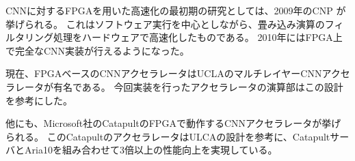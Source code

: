 CNNに対するFPGAを用いた高速化の最初期の研究としては、2009年のCNP \cite{cnp}が挙げられる。
これはソフトウェア実行を中心としながら、畳み込み演算のフィルタリング処理をハードウェアで高速化したものである。
2010年にはFPGA上で完全なCNN実装\cite{NEC_Labs_America1}\cite{NEC_Labs_America2}\cite{NEC_Labs_America3}が行えるようになった。

現在、FPGAベースのCNNアクセラレータはUCLAのマルチレイヤーCNNアクセラレータ\cite{fpgaopt}が有名である。
今回実装を行ったアクセラレータの演算部はこの設計を参考にした。

他にも、Microsoft社のCatapultのFPGAで動作するCNNアクセラレータ\cite{ms_fpgacnn}が挙げられる。
このCatapultのアクセラレータはULCAの設計を参考に、CatapultサーバとAria10を組み合わせて3倍以上の性能向上を実現している。




